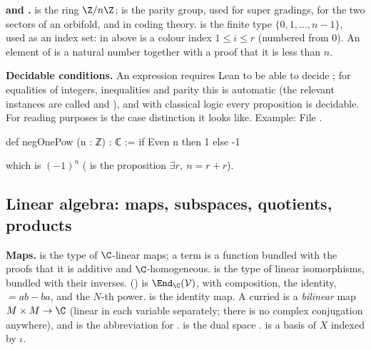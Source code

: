 \textbf{ and .}  is the ring $\Z/n\Z$;  is the
parity group, used for super gradings, for the two sectors of an orbifold, and in coding theory.
 is the finite type $\{0,1,\dots,n-1\}$, used as an index set:  in
 above is a colour index $1\le i\le r$ (numbered from $0$). An element of 
is a natural number together with a proof that it is less than $n$.

\textbf{Decidable conditions.} An expression  requires Lean to be able to
decide ; for equalities of integers, inequalities and parity this is automatic (the relevant
instances are called  and ), and with classical logic every
proposition is decidable. For reading purposes  is the case distinction it
looks like. Example:
\noindent File .
\begin{leancode}
def negOnePow (n : ℤ) : ℂ := if Even n then 1 else -1
\end{leancode}
which is $(-1)^n$ ( is the proposition $\exists r,\ n = r + r$).

\subsection{Linear algebra: maps, subspaces, quotients, products}\label{ch01:sec:linalg}

\textbf{Maps.}  is the type of $\C$-linear maps; a term is a function bundled with
the proofs that it is additive and $\C$-homogeneous.  is the type of linear
isomorphisms, bundled with their inverses.  () is
$\End_\C(\choneV)$, with \lean{*} composition,  the identity,  $=ab-ba$, and
 the $N$-th power.  is the identity map. A curried
 is a \emph{bilinear} map $M\times M\to\C$ (linear in each variable
separately; there is no complex conjugation anywhere), and  is the
abbreviation for .  is the dual space
.  is a basis of $X$ indexed by $\iota$.

